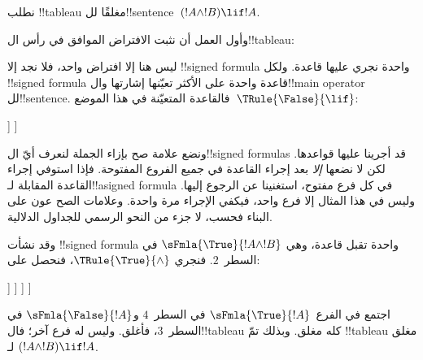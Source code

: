 \documentclass[../../../include/open-logic-section]{subfiles}
\begin{document}
      {}
      {}


\begin{ex}
نطلب !!{tableau} مغلقًا لل!!{sentence}~$(!A \land !B) \lif !A$.

وأول العمل أن نثبت الافتراض الموافق في رأس ال!!{tableau}:
\begin{oltableau}
  [\sFmla{\False}{(\formula{A} \land \formula{B}) \lif \formula{A}},
    just = \TAss]
\end{oltableau}

ليس هنا إلا افتراض واحد، فلا نجد إلا !!{signed formula} واحدة
نجري عليها قاعدة. ولكل !!{signed formula} قاعدة واحدة على الأكثر
تعيّنها إشارتها وال!!{main operator} لل!!{sentence}.
فالقاعدة المتعيّنة في هذا الموضع~$\TRule{\False}{\lif}$:
\begin{oltableau}
  [\sFmla{\False}{(\formula{A} \land \formula{B}) \lif \formula{A}},
    checked, just = \TAss
    [\sFmla{\True}{\formula{A} \land \formula{B}},
      just={\TRule{\False}{\lif}[1]}
      [\sFmla{\False}{\formula{A}}, just={\TRule{\False}{\lif}[1]}]
    ]
  ]
\end{oltableau}
ونضع علامة صح بإزاء الجملة لنعرف أيّ ال!!{signed formula}s قد
أجرينا عليها قواعدها. لكن لا نضعها \emph{إلا} بعد إجراء القاعدة
في جميع الفروع المفتوحة. فإذا استوفي إجراء القاعدة المقابلة
لـ!!a{signed formula} في كل فرع مفتوح، استغنينا عن الرجوع إليها.
وليس في هذا المثال إلا فرع واحد، فيكفي الإجراء مرة واحدة.
وعلامات الصح عون على البناء فحسب، لا جزء من النحو الرسمي للجداول
الدلالية.

وقد نشأت !!{signed formula} واحدة تقبل قاعدة، وهي
$\sFmla{\True}{!A \land !B}$ في السطر~$2$. فنجري
$\TRule{\True}{\land}$، فنحصل على:
\begin{oltableau}
  [\sFmla{\False}{(\formula{A} \land \formula{B}) \lif \formula{A}},
    checked, just = \TAss
    [\sFmla{\True}{\formula{A} \land \formula{B}},
      just={\TRule{\False}{\lif}[1]}, checked
      [\sFmla{\False}{\formula{A}}, just={\TRule{\False}{\lif}[1]}
        [\sFmla{\True}{\formula{A}}, just={\TRule{\True}{\land}[2]}
          [\sFmla{\True}{\formula{B}}, just={\TRule{\True}{\land}[2]}, close
          ]
        ]
      ]
    ]
  ]
\end{oltableau}
اجتمع في الفرع~$\sFmla{\True}{!A}$ في السطر~$4$
و$\sFmla{\False}{!A}$ في السطر~$3$، فأغلق. وليس له فرع آخر؛
فال!!{tableau} كله مغلق. وبذلك تمّ !!{tableau} مغلق لـ
$(!A \land !B) \lif !A$.
\end{ex}
\end{document}
